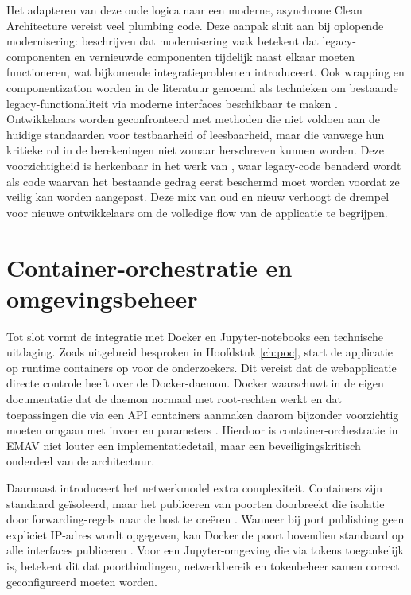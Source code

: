 Het adapteren van deze oude logica naar een moderne, asynchrone Clean Architecture vereist veel plumbing code. Deze aanpak sluit aan bij oplopende modernisering: \textcite{seacord2001legacyModernization} beschrijven dat modernisering vaak betekent dat legacy-componenten en vernieuwde componenten tijdelijk naast elkaar moeten functioneren, wat bijkomende integratieproblemen introduceert. Ook wrapping en componentization worden in de literatuur genoemd als technieken om bestaande legacy-functionaliteit via moderne interfaces beschikbaar te maken \autocite{comellaDorda2000survey}. Ontwikkelaars worden geconfronteerd met methoden die niet voldoen aan de huidige standaarden voor testbaarheid of leesbaarheid, maar die vanwege hun kritieke rol in de berekeningen niet zomaar herschreven kunnen worden. Deze voorzichtigheid is herkenbaar in het werk van \textcite{feathers2004legacyCode}, waar legacy-code benaderd wordt als code waarvan het bestaande gedrag eerst beschermd moet worden voordat ze veilig kan worden aangepast. Deze mix van oud en nieuw verhoogt de drempel voor nieuwe ontwikkelaars om de volledige flow van de applicatie te begrijpen.

\section{Container-orchestratie en omgevingsbeheer}
Tot slot vormt de integratie met Docker en Jupyter-notebooks een technische uitdaging.
 Zoals uitgebreid besproken in Hoofdstuk \ref{ch:poc}, start de applicatie op runtime containers op voor de onderzoekers. Dit vereist dat de webapplicatie directe controle heeft over de Docker-daemon. Docker waarschuwt in de eigen documentatie dat de daemon normaal met root-rechten werkt en dat toepassingen die via een API containers aanmaken daarom bijzonder voorzichtig moeten omgaan met invoer en parameters \autocite{dockerEngineSecurity}. Hierdoor is container-orchestratie in EMAV niet louter een implementatiedetail, maar een beveiligingskritisch onderdeel van de architectuur.

Daarnaast introduceert het netwerkmodel extra complexiteit. Containers zijn standaard geïsoleerd, maar het publiceren van poorten doorbreekt die isolatie door forwarding-regels naar de host te creëren \autocite{dockerPublishingPorts}. Wanneer bij port publishing geen expliciet IP-adres wordt opgegeven, kan Docker de poort bovendien standaard op alle interfaces publiceren \autocite{dockerRunReference}. Voor een Jupyter-omgeving die via tokens toegankelijk is, betekent dit dat poortbindingen, netwerkbereik en tokenbeheer samen correct geconfigureerd moeten worden.

